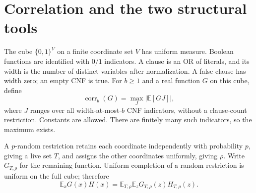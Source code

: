 \documentclass[11pt,letterpaper]{article}
\theoremstyle{definition}
\numberwithin{equation}{section}
\newcommand{\E}{\mathbb E}
\newcommand{\bits}{\{0,1\}}
\DeclareMathOperator{\corr}{corr}
\begin{document}
\section{Correlation and the two structural tools}\label{sec:tools}
The cube $\bits^V$ on a finite coordinate set $V$ has uniform measure.
Boolean functions are identified with $0/1$ indicators. A clause is an OR
of literals, and its width is the number of distinct variables after
normalization. A false clause has width zero; an empty CNF is true.
For $b\ge1$ and a real function $G$ on this cube, define
\[
 \corr_b(G)=\max_J |\E[GJ]|,
\]
where $J$ ranges over all width-at-most-$b$ CNF indicators, without a
clause-count restriction. Constants are allowed. There are finitely many
such indicators, so the maximum exists.

A $p$-random restriction retains each coordinate independently with
probability $p$, giving a live set $T$, and assigns the other coordinates
uniformly, giving $\rho$. Write $G_{T,\rho}$ for the remaining function.
Uniform completion of a random restriction is uniform on the full cube;
therefore
\begin{equation}\label{eq:restriction-average}
 \E_xG(x)H(x)=\E_{T,\rho}\E_zG_{T,\rho}(z)H_{T,\rho}(z).
\end{equation}
\end{document}

